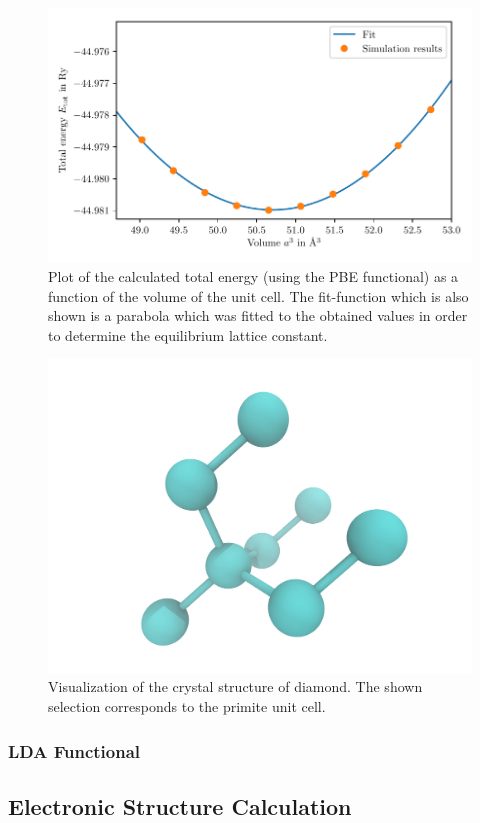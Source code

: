 \documentclass[a4paper,10pt,bibtotoc]{scrartcl}
\begin{document}
\begin{figure}[h]
\centering
 \includegraphics[width=\textwidth]{Figure_lattice_constant_PBE.pdf}
 \caption{Plot of the calculated total energy (using the PBE functional) as a function of the volume of the unit cell. The fit-function which is also shown is a parabola which was fitted to the obtained values in order to determine the equilibrium lattice constant.}
 \label{fig:fig2}
\end{figure}

\begin{figure}[h]
\centering
 \includegraphics[width=\textwidth]{structure.png}
 \caption{Visualization of the crystal structure of diamond. The shown selection corresponds to the primite unit cell.}
 \label{fig:fig3}
\end{figure}

\subsubsection{LDA Functional}

\subsection{Electronic Structure Calculation}
\end{document}
